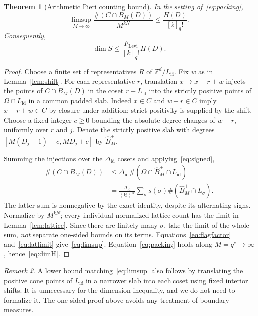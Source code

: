 \documentclass[11pt]{article}
\newtheorem{theorem}{Theorem}[section]
\theoremstyle{remark}\newtheorem{remark}[theorem]{Remark}
\newcommand{\Z}{\mathbb Z}\newcommand{\N}{\mathbb N}\newcommand{\R}{\mathbb R}
\begin{document}
\begin{theorem}[Arithmetic Pieri counting bound]\label{thm:count}
In the setting of~\eqref{eq:packing},
\begin{equation}\label{eq:limsup}
 \limsup_{M\to\infty}\frac{\#(C\cap B_M(D))}{M^{kN}}
 \leq\frac{H(D)}{[k]_q!}.
\end{equation}
Consequently,
\begin{equation}\label{eq:dimH}
 \dim S\leq\frac{F_{\mathrm{Levi}}}{[k]_q!}H(D).
\end{equation}
\end{theorem}
\begin{proof}
Choose a finite set of representatives $R$ of $\Z^d/L_{\mathrm{id}}$. Fix $w$ as in Lemma~\ref{lem:shift}. For each representative $r$, translation $x\mapsto x-r+w$ injects the points of $C\cap B_M(D)$ in the coset $r+L_{\mathrm{id}}$ into the strictly positive points of $\Omega\cap L_{\mathrm{id}}$ in a common padded slab. Indeed $x\in C$ and $w-r\in C$ imply $x-r+w\in C$ by closure under addition; strict positivity is supplied by the shift. Choose a fixed integer $c\geq0$ bounding the absolute degree changes of $w-r$, uniformly over $r$ and $j$. Denote the strictly positive slab with degrees $[M(D_j-1)-c,MD_j+c]$ by $\widehat B_M^+$.

Summing the injections over the $\Delta_{\mathrm{id}}$ cosets and applying~\eqref{eq:signed},
\begin{align}
 \#(C\cap B_M(D))
 &\leq \Delta_{\mathrm{id}}\#(\Omega\cap\widehat B_M^+\cap L_{\mathrm{id}})\\
 &=\frac{\Delta_{\mathrm{id}}}{(k!)^N}
 \sum_\sigma s(\sigma)\#(\widehat B_M^+\cap L_\sigma).
\end{align}
The latter sum is nonnegative by the exact identity, despite its alternating signs. Normalize by $M^{kN}$; every individual normalized lattice count has the limit in Lemma~\ref{lem:lattice}. Since there are finitely many $\sigma$, take the limit of the whole sum, \emph{not} separate one-sided bounds on its terms. Equations~\eqref{eq:flagfactor} and~\eqref{eq:latlimit} give~\eqref{eq:limsup}. Equation~\eqref{eq:packing} holds along $M=q^e\to\infty$, hence~\eqref{eq:dimH}.
\end{proof}

\begin{remark}
A lower bound matching~\eqref{eq:limsup} also follows by translating the positive cone points of $L_{\mathrm{id}}$ in a narrower slab into each coset using fixed interior shifts. It is unnecessary for the dimension inequality, and we do not need to formalize it. The one-sided proof above avoids any treatment of boundary measures.
\end{remark}
\end{document}
